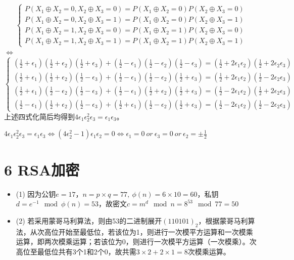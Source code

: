 \documentclass[10pt,a4paper]{article}
\begin{document}
$$
\left\{\begin{aligned}
P(X_1 \oplus X_2=0,X_2 \oplus X_3=0) = P(X_1 \oplus X_2=0)P(X_2 \oplus X_3=0)\\
P(X_1 \oplus X_2=0,X_2 \oplus X_3=1) = P(X_1 \oplus X_2=0)P(X_2 \oplus X_3=1)\\
P(X_1 \oplus X_2=1,X_2 \oplus X_3=0) = P(X_1 \oplus X_2=1)P(X_2 \oplus X_3=0)\\
P(X_1 \oplus X_2=1,X_2 \oplus X_3=1) = P(X_1 \oplus X_2=1)P(X_2 \oplus X_3=1)
\end{aligned}\right.
$$
$\iff$
$$
\left\{\begin{aligned}
(\frac{1}{2}+\epsilon_1)(\frac{1}{2}+\epsilon_2)(\frac{1}{2}+\epsilon_3) + (\frac{1}{2}-\epsilon_1)(\frac{1}{2}-\epsilon_2)(\frac{1}{2}-\epsilon_3) = (\frac{1}{2}+2\epsilon_1\epsilon_2)(\frac{1}{2}+2\epsilon_2\epsilon_3)\\
(\frac{1}{2}+\epsilon_1)(\frac{1}{2}+\epsilon_2)(\frac{1}{2}-\epsilon_3) + (\frac{1}{2}-\epsilon_1)(\frac{1}{2}-\epsilon_2)(\frac{1}{2}+\epsilon_3) = (\frac{1}{2}+2\epsilon_1\epsilon_2)(\frac{1}{2}-2\epsilon_2\epsilon_3)\\
(\frac{1}{2}+\epsilon_1)(\frac{1}{2}-\epsilon_2)(\frac{1}{2}-\epsilon_3) + (\frac{1}{2}-\epsilon_1)(\frac{1}{2}+\epsilon_2)(\frac{1}{2}+\epsilon_3) = (\frac{1}{2}-2\epsilon_1\epsilon_2)(\frac{1}{2}+2\epsilon_2\epsilon_3)\\
(\frac{1}{2}-\epsilon_1)(\frac{1}{2}+\epsilon_2)(\frac{1}{2}-\epsilon_3) + (\frac{1}{2}+\epsilon_1)(\frac{1}{2}-\epsilon_2)(\frac{1}{2}+\epsilon_3) = (\frac{1}{2}-2\epsilon_1\epsilon_2)(\frac{1}{2}-2\epsilon_2\epsilon_3)
\end{aligned}\right.
$$
上述四式化简后均得到$4\epsilon_1\epsilon_2^2\epsilon_3=\epsilon_1\epsilon_3$。

$4\epsilon_1\epsilon_2^2\epsilon_3=\epsilon_1\epsilon_3 \iff (4\epsilon_2^2-1)\epsilon_1\epsilon_2=0 \iff \epsilon_1 = 0\ or\ \epsilon_3=0\ or\ \epsilon_2=\pm\frac{1}{2}$
\section*{6 RSA加密}
\begin{itemize}
\item[] (1)
    因为公钥$e=17$，$n = p\times q = 77,\ \phi(n) = 6 \times 10 = 60$，私钥$d=e^{-1} \mod \phi(n) = 53$，故密文$c=m^d \mod n = 8 ^ {53} \mod 77 = 50$
\item[] (2)
    若采用蒙哥马利算法，则由53的二进制展开$(110101)_2$，根据蒙哥马利算法，从次高位开始至最低位，若该位为1，则进行一次模平方运算和一次模乘运算，即两次模乘运算；若该位为0，则进行一次模平方运算（一次模乘）。次高位至最低位共有3个1和2个0，故共需$3\times2+2\times1=8$次模乘运算。
\end{itemize}
\end{document}
